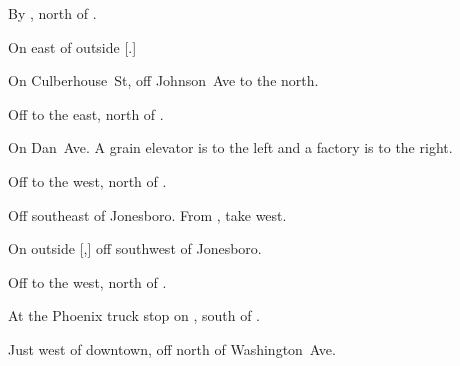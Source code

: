 
\begin{LocationList}

By , north of .

On  east of  outside [.]

On Culberhouse~St, off  Johnson~Ave to the north.

Off  to the east, north of .

On  Dan~Ave.
A grain elevator is to the left and a factory is to the right.

\Location{\GarageHQ \Garage}
Off  to the west, north of .

Off  southeast of Jonesboro.
From , take  west.

On  outside [,] off  southwest of Jonesboro.

Off  to the west, north of .

At the Phoenix truck stop on , south of .

Just west of downtown, off  north of Washington~Ave.

\end{LocationList}
